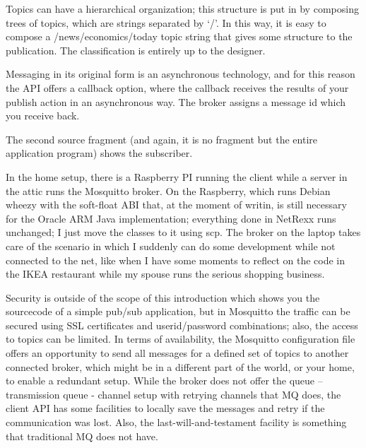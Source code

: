 
 
Topics can have a hierarchical organization; this structure is put in by composing trees of topics, which are strings separated by ‘/’. In this way, it is easy to compose a /news/economics/today topic string that gives some structure to the publication. The classification is entirely up to the designer.
 
Messaging in its original form is an asynchronous technology, and for this reason the API offers a callback option, where the callback receives the results of your publish action in an asynchronous way. The broker assigns a message id which you receive back.
 
 
The second source fragment (and again, it is no fragment but the entire application program) shows the subscriber.
 


In the home setup, there is a Raspberry PI running the client while a server in the attic runs the Mosquitto broker. On the Raspberry, which runs Debian wheezy with the soft-float ABI that, at the moment of writin, is still necessary for the Oracle ARM Java implementation; everything done in NetRexx runs unchanged; I just move the classes to it using scp. The broker on the laptop takes care of the scenario in which I suddenly can do some development while not connected to the net, like when I have some moments to reflect on the code in the IKEA restaurant while my spouse runs the serious shopping business.
 
 
 
Security is outside of the scope of this introduction which shows you the sourcecode of a simple pub/sub application, but in Mosquitto the traffic can be secured using SSL certificates and userid/password combinations; also, the access to topics can be limited. In terms of availability, the Mosquitto configuration file offers an opportunity to send all messages for a defined set of topics to another connected broker, which might be in a different part of the world, or your home, to enable a redundant setup. While the broker does not offer the queue – transmission queue - channel setup with retrying channels that MQ does, the client API has some facilities to locally save the messages and retry if the communication was lost. Also, the last-will-and-testament facility is something that traditional MQ does not have.
 
 